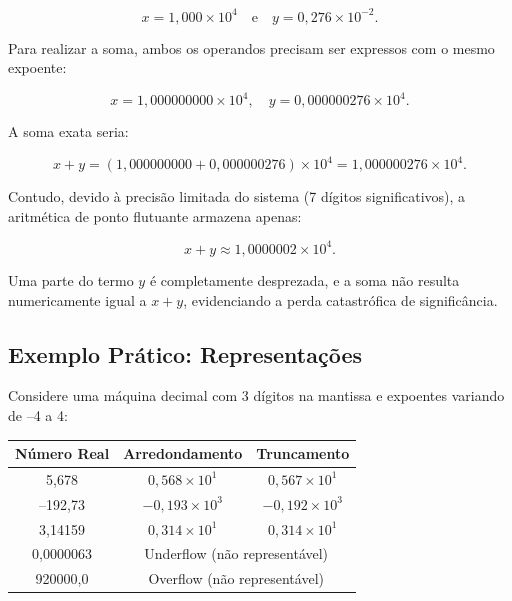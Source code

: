 \[
x = 1{,}000 \times 10^{4} \quad \text{e} \quad y = 0{,}276 \times 10^{-2}.
\]

Para realizar a soma, ambos os operandos precisam ser expressos com o mesmo expoente:

\[
x = 1{,}000000000 \times 10^4, \quad y = 0{,}000000276 \times 10^4.
\]

A soma exata seria:

\[
x + y = (1{,}000000000 + 0{,}000000276) \times 10^4 = 1{,}000000276 \times 10^4.
\]

Contudo, devido à precisão limitada do sistema (7 dígitos significativos), a aritmética de ponto flutuante armazena apenas:

\[
x + y \approx 1{,}0000002 \times 10^4.
\]

Uma parte do termo \( y \) é completamente desprezada, e a soma não resulta numericamente igual a \( x + y\), evidenciando a perda catastrófica de significância.



\subsection*{Exemplo Prático: Representações}

Considere uma máquina decimal com 3 dígitos na mantissa e expoentes variando de –4 a 4:

\begin{center}
\begin{tabular}{|c|c|c|}
\hline
\textbf{Número Real} & \textbf{Arredondamento} & \textbf{Truncamento} \\
\hline
5{,}678 & \( 0{,}568 \times 10^1 \) & \( 0{,}567 \times 10^1 \) \\
\hline
–192{,}73 & \( -0{,}193 \times 10^3 \) & \( -0{,}192 \times 10^3 \) \\
\hline
3{,}14159 & \( 0{,}314 \times 10^1 \) & \( 0{,}314 \times 10^1 \) \\
\hline
0{,}0000063 & \multicolumn{2}{c|}{Underflow (não representável)} \\
\hline
920000{,}0 & \multicolumn{2}{c|}{Overflow (não representável)} \\
\hline
\end{tabular}
\end{center}

\newpage

